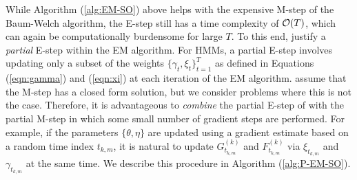 While Algorithm (\ref{alg:EM-SO}) above helps with the expensive M-step of the Baum-Welch algorithm, the E-step still has a time complexity of $\mathcal{O}(T)$, which can again be computationally burdensome for large $T$. 
To this end, \citet{Neal:1998} justify a \textit{partial} E-step within the EM algorithm. For HMMs, a partial E-step involves updating only a subset of the weights $\{\gamma_t,\xi_t\}_{t=1}^T$ as defined in Equations (\ref{eqn:gamma}) and (\ref{eqn:xi}) at each iteration of the EM algorithm. \citet{Neal:1998} assume that the M-step has a closed form solution, but we consider problems where this is not the case. 
Therefore, it is advantageous to \textit{combine} the partial E-step of \citet{Neal:1998} with the partial M-step in which some small number of gradient steps are performed. For example, if the parameters $\{\theta, \eta\}$ are updated using a gradient estimate based on a random time index $t_{k,m}$, it is natural to update $G_{t_{k,m}}^{(k)}$ and $F_{t_{k,m}}^{(k)}$ via $\xi_{t_{k,m}}$ and $\gamma_{t_{k,m}}$ at the same time. We describe this procedure in Algorithm (\ref{alg:P-EM-SO}).


